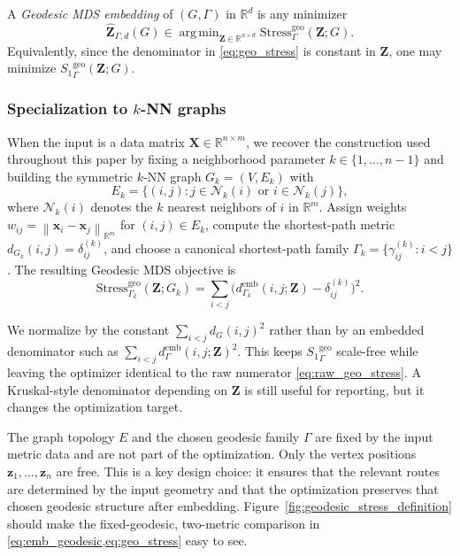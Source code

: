 \documentclass[11pt]{article}
\newcommand{\R}{\mathbb{R}}
\newcommand{\bx}{\mathbf{x}}
\newcommand{\bX}{\mathbf{X}}
\newcommand{\bz}{\mathbf{z}}
\newcommand{\bZ}{\mathbf{Z}}
\newcommand{\norm}[1]{\left\|#1\right\|}
\newcommand{\demb}{d^{\mathrm{emb}}}
\newcommand{\Gk}{G_k}
\newcommand{\Stress}{\mathrm{Stress}}
\newcommand{\StressOne}{S_1}
\DeclareMathOperator*{\argmin}{arg\,min}
\begin{document}
A \emph{Geodesic MDS embedding} of $(G,\Gamma)$ in $\R^d$ is any
minimizer
\begin{equation}
  \hat{\bZ}_{\Gamma,d}(G)
  \in \argmin_{\bZ \in \R^{n \times d}}
  \Stress^{\mathrm{geo}}_{\Gamma}(\bZ; G).
  \label{eq:geo_mds}
\end{equation}
Equivalently, since the denominator in \cref{eq:geo_stress} is constant
in $\bZ$, one may minimize ${\StressOne}_{\Gamma}^{\mathrm{geo}}(\bZ; G)$.

\subsubsection*{Specialization to $k$-NN graphs}
When the input is a data matrix $\bX \in \R^{n \times m}$, we recover the
construction used throughout this paper by fixing a neighborhood parameter
$k \in \{1,\ldots,n-1\}$ and building the symmetric $k$-NN graph
$\Gk = (V, E_k)$ with
\begin{equation}
  E_k = \{(i,j) : j \in \mathcal{N}_k(i) \text{ or } i \in \mathcal{N}_k(j)\},
  \label{eq:knn_edges}
\end{equation}
where $\mathcal{N}_k(i)$ denotes the $k$ nearest neighbors of $i$ in
$\R^m$.  Assign weights $w_{ij} = \norm{\bx_i - \bx_j}_{\R^m}$ for
$(i,j) \in E_k$, compute the shortest-path metric
$d_{\Gk}(i,j) = \delta_{ij}^{(k)}$, and choose a canonical shortest-path
family $\Gamma_k = \{\gamma_{ij}^{(k)} : i < j\}$.  The resulting Geodesic
MDS objective is
\begin{equation}
  \Stress^{\mathrm{geo}}_{\Gamma_k}(\bZ; \Gk)
  = \sum_{i < j}
    \bigl(\demb_{\Gamma_k}(i,j;\bZ) - \delta^{(k)}_{ij}\bigr)^2.
  \label{eq:knn_raw_geo_stress}
\end{equation}

We normalize by the constant $\sum_{i<j} d_G(i,j)^2$ rather than by an
embedded denominator such as $\sum_{i<j} \demb_{\Gamma}(i,j;\bZ)^2$.
This keeps ${\StressOne}_{\Gamma}^{\mathrm{geo}}$ scale-free while
leaving the optimizer identical to the raw numerator
\cref{eq:raw_geo_stress}.  A Kruskal-style denominator depending on
$\bZ$ is still useful for reporting, but it changes the optimization
target.

The graph topology $E$ and the chosen geodesic family $\Gamma$ are fixed
by the input metric data and are not part of the optimization.  Only the
vertex positions $\bz_1,\ldots,\bz_n$ are free.  This is a key design
choice: it ensures that the relevant routes are determined by the input
geometry and that the optimization preserves that chosen geodesic
structure after embedding.
Figure~\ref{fig:geodesic_stress_definition} should make the fixed-geodesic,
two-metric comparison in \cref{eq:emb_geodesic,eq:geo_stress} easy to see.
\end{document}

